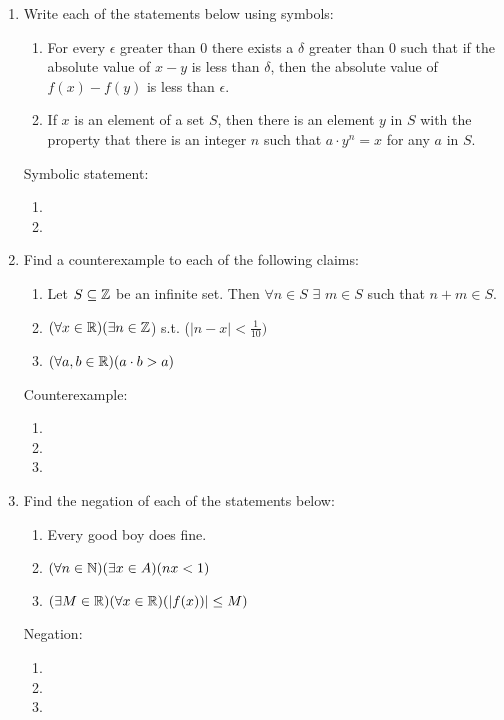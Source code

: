 \documentclass[12pt]{article}
\newcommand{\ZZ}    {\Bbb{Z}}
\newcommand{\RR}    {\Bbb{R}}
\newcommand{\NN}    {\Bbb{N}}
\begin{document}
\begin{enumerate}

\item  Write each of the statements below using symbols:

\begin{enumerate}
\item For every $\epsilon$ greater than $0$ there exists a $\delta$ greater than $0$ such that if the absolute value of $x-y$ is less than $\delta$, then the absolute value of $f(x)-f(y)$ is less than $\epsilon$.
\item  If $x$ is an element of a set $S$, then there is an element $y$ in $S$ with the property that there is an integer $n$ such that $a\cdot y^n=x$ for any $a$ in $S$.
\end{enumerate}

Symbolic statement:

\begin{enumerate}
\item
\item
\end{enumerate}


\item  Find a counterexample to each of the following claims:

\begin{enumerate}
\item  Let $S\subseteq \ZZ$ be an infinite set.  Then $\forall n\in S$ $\exists$ $m\in S$ such that $n+m\in S$.
\item $(\forall x \in \RR) (\exists n\in \ZZ$) s.t. ($|n-x| < \frac{1}{10})$
\item $(\forall a,b\in \RR)(a\cdot b>a)$
\end{enumerate}

Counterexample:
\begin{enumerate}
\item
\item
\item
\end{enumerate}

\item  Find the negation of each of the statements below:

\begin{enumerate}
\item Every good boy does fine.
\item $(\forall n\in \NN)(\exists x \in A)(nx<1)$
\item $(\exists M \in \RR)(\forall x \in \RR)(|f(x))|\leq M)$
\end{enumerate}

Negation:
\begin{enumerate}
\item
\item
\item
\end{enumerate}


\end{enumerate}
\end{document}
